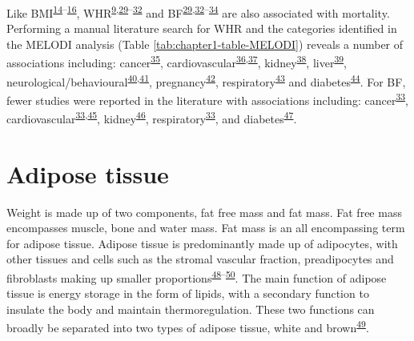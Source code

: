 \documentclass[11pt,twoside]{bristolthesis}
\begin{document}
Like BMI\textsuperscript{\protect\hyperlink{ref-Flegal2013}{14}--\protect\hyperlink{ref-Elagizi2018}{16}}, WHR\textsuperscript{\protect\hyperlink{ref-Pischon2008}{9},\protect\hyperlink{ref-Jenkins2018}{29}--\protect\hyperlink{ref-Dong2018}{32}} and BF\textsuperscript{\protect\hyperlink{ref-Jenkins2018}{29},\protect\hyperlink{ref-Dong2018}{32}--\protect\hyperlink{ref-Bigaard2004}{34}} are also associated with mortality. Performing a manual literature search for WHR and the categories identified in the MELODI analysis (Table \ref{tab:chapter1-table-MELODI}) reveals a number of associations including: cancer\textsuperscript{\protect\hyperlink{ref-Barberio2019}{35}}, cardiovascular\textsuperscript{\protect\hyperlink{ref-Dobbelsteyn2001}{36},\protect\hyperlink{ref-Yusuf2005}{37}}, kidney\textsuperscript{\protect\hyperlink{ref-Elsayed2008}{38}}, liver\textsuperscript{\protect\hyperlink{ref-Sahlman2020}{39}}, neurological/behavioural\textsuperscript{\protect\hyperlink{ref-Wiltink2013}{40},\protect\hyperlink{ref-Dye2017}{41}}, pregnancy\textsuperscript{\protect\hyperlink{ref-Basraon2016}{42}}, respiratory\textsuperscript{\protect\hyperlink{ref-Price2006a}{43}} and diabetes\textsuperscript{\protect\hyperlink{ref-Qiao2010}{44}}. For BF, fewer studies were reported in the literature with associations including: cancer\textsuperscript{\protect\hyperlink{ref-Lee2018}{33}}, cardiovascular\textsuperscript{\protect\hyperlink{ref-Lee2018}{33},\protect\hyperlink{ref-Romero-Corral2010}{45}}, kidney\textsuperscript{\protect\hyperlink{ref-Oh2014}{46}}, respiratory\textsuperscript{\protect\hyperlink{ref-Lee2018}{33}}, and diabetes\textsuperscript{\protect\hyperlink{ref-Jo2018}{47}}.

\hypertarget{adipose-tissue}{%
\section{Adipose tissue}\label{adipose-tissue}}

Weight is made up of two components, fat free mass and fat mass. Fat free mass encompasses muscle, bone and water mass. Fat mass is an all encompassing term for adipose tissue. Adipose tissue is predominantly made up of adipocytes, with other tissues and cells such as the stromal vascular fraction, preadipocytes and fibroblasts making up smaller proportions\textsuperscript{\protect\hyperlink{ref-Frayn2003}{48}--\protect\hyperlink{ref-Luo2016}{50}}. The main function of adipose tissue is energy storage in the form of lipids, with a secondary function to insulate the body and maintain thermoregulation. These two functions can broadly be separated into two types of adipose tissue, white and brown\textsuperscript{\protect\hyperlink{ref-Cohen2016}{49}}.
\end{document}
